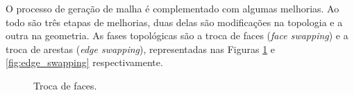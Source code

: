 O processo de geração de malha é complementado com algumas melhorias. Ao todo são três etapas de melhorias, duas delas são modificações na topologia e a outra na geometria. As fases topológicas são a troca de faces (\textit{face swapping}) e a troca de arestas (\textit{edge swapping}), representadas nas Figuras \ref{fig:face_swapping} e \ref{fig:edge_swapping} respectivamente.


\begin{figure}[!ht]
	
	\centering
	\qquad	
	
	\caption{Troca de faces.}
	
	\label{fig:face_swapping}
	
\end{figure}


